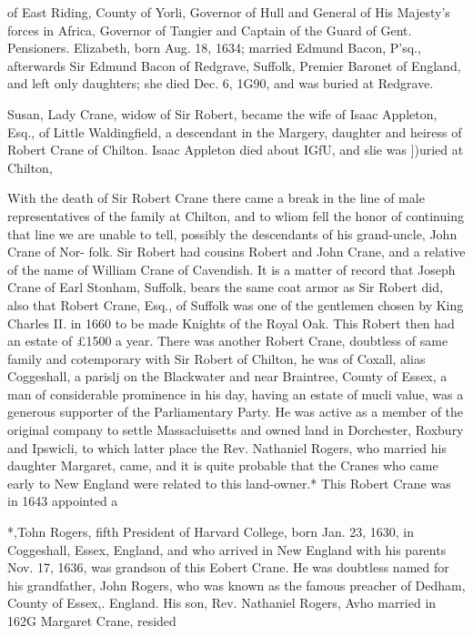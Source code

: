\documentclass{book}
\begin{document}
of East Riding, County of Yorli, Governor of Hull and General 
of His Majesty's forces in Africa, Governor of Tangier and 
Captain of the Guard of Gent. Pensioners. Elizabeth, born Aug. 
18, 1634; married Edmund Bacon, P'sq., afterwards Sir Edmund 
Bacon of Redgrave, Suffolk, Premier Baronet of England, and 
left only daughters; she died Dec. 6, 1G90, and was buried at 
Redgrave. 

Susan, Lady Crane, widow of Sir Robert, became the wife of 
Isaac Appleton, Esq., of Little Waldingfield, a descendant in the 
Margery, daughter and heiress of Robert Crane of Chilton. 
Isaac Appleton died about IGfU, and slie was ])uried at Chilton, 

With the death of Sir Robert Crane there came a break in the 
line of male representatives of the family at Chilton, and to 
wliom fell the honor of continuing that line we are unable to tell, 
possibly the descendants of his grand-uncle, John Crane of Nor- 
folk. Sir Robert had cousins Robert and John Crane, and a 
relative of the name of William Crane of Cavendish. It is a 
matter of record that Joseph Crane of Earl Stonham, Suffolk, 
bears the same coat armor as Sir Robert did, also that Robert 
Crane, Esq., of Suffolk was one of the gentlemen chosen by 
King Charles II. in 1660 to be made Knights of the Royal Oak. 
This Robert then had an estate of £1500 a year. There was 
another Robert Crane, doubtless of same family and cotemporary 
with Sir Robert of Chilton, he was of Coxall, alias Coggeshall, a 
parislj on the Blackwater and near Braintree, County of Essex, a 
man of considerable prominence in his day, having an estate of 
mucli value, was a generous supporter of the Parliamentary 
Party. He was active as a member of the original company to 
settle Massacluisetts and owned land in Dorchester, Roxbury and 
Ipswicli, to which latter place the Rev. Nathaniel Rogers, who 
married his daughter Margaret, came, and it is quite probable 
that the Cranes who came early to New England were related to 
this land-owner.* This Robert Crane was in 1643 appointed a 



*,Tohn Rogers, fifth President of Harvard College, born Jan. 23, 1630, 
in Coggeshall, Essex, England, and who arrived in New England with 
his parents Nov. 17, 1636, was grandson of this Eobert Crane. He was 
doubtless named for his grandfather, John Rogers, who was known as 
the famous preacher of Dedham, County of Essex,. England. His son, 
Rev. Nathaniel Rogers, Avho married in 162G Margaret Crane, resided 
\end{document}
